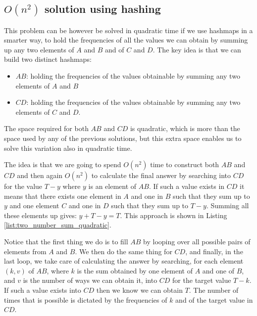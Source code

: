 


\subsection{$O(n^2)$ solution using hashing}

This problem can be however be solved in quadratic time if we use hashmaps in a smarter way, to hold 
the frequencies of all the values we can obtain by summing up any two elements of $A$ and $B$ and of $C$ and $D$.
The key idea is that we can build two distinct hashmaps:
\begin{itemize}
	\item $AB$: holding the frequencies of the values obtainable by summing any two elements of $A$ and $B$
	\item $CD$: holding the frequencies of the values obtainable by summing any two elements of $C$ and $D$.
\end{itemize}

The space required for both $AB$ and $CD$ is quadratic, which is more than the space used by any of the previous solutions, but this extra space
enables us to solve this variation also in quadratic time. 

The idea is that we are going to spend $O(n^2)$ time to construct both $AB$ and $CD$
and then again $O(n^2)$ to calculate the final answer 
by searching into $CD$ for the value $T-y$ where $y$ is an element of $AB$. 
If such a value exists in $CD$ it means that there exists one element in  $A$ and one in $B$ such that they sum up to $y$ and
one element $C$ and one in $D$ such that they sum up to $T-y$. Summing all these elements up gives: $y+T-y = T$.
This approach is shown in Listing \ref{list:two_number_sum_quadratic}. 



Notice that the first thing we do is to fill $AB$ by looping over all possible pairs of elements from $A$ and $B$.
We then do the same thing for $CD$, and finally, in the last loop, we take care of calculating the answer by searching, for each element $(k,v)$ of $AB$, where $k$ is the sum obtained by one element of $A$ and one of $B$, and $v$ is the number of ways we can obtain it,
into $CD$ for the target value $T-k$. If such a value exists into $CD$ then we know we can obtain $T$. The number of times
that is possible is dictated by the frequencies of $k$ and of the target value in $CD$.

